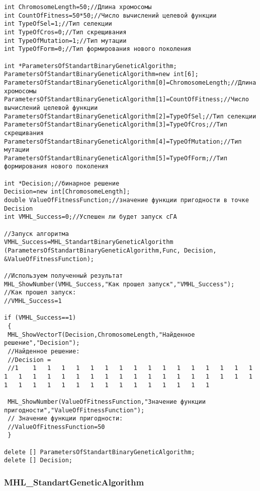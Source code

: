 \documentclass[a4paper,12pt]{article}
\begin{document}
\begin{lstlisting}[label=code_use_MHL_StandartBinaryGeneticAlgorithm,caption=Пример использования]
int ChromosomeLength=50;//Длина хромосомы
int CountOfFitness=50*50;//Число вычислений целевой функции
int TypeOfSel=1;//Тип селекции
int TypeOfCros=0;//Тип скрещивания
int TypeOfMutation=1;//Тип мутации
int TypeOfForm=0;//Тип формирования нового поколения

int *ParametersOfStandartBinaryGeneticAlgorithm;
ParametersOfStandartBinaryGeneticAlgorithm=new int[6];
ParametersOfStandartBinaryGeneticAlgorithm[0]=ChromosomeLength;//Длина хромосомы
ParametersOfStandartBinaryGeneticAlgorithm[1]=CountOfFitness;//Число вычислений целевой функции
ParametersOfStandartBinaryGeneticAlgorithm[2]=TypeOfSel;//Тип селекции
ParametersOfStandartBinaryGeneticAlgorithm[3]=TypeOfCros;//Тип скрещивания
ParametersOfStandartBinaryGeneticAlgorithm[4]=TypeOfMutation;//Тип мутации
ParametersOfStandartBinaryGeneticAlgorithm[5]=TypeOfForm;//Тип формирования нового поколения

int *Decision;//бинарное решение
Decision=new int[ChromosomeLength];
double ValueOfFitnessFunction;//значение функции пригодности в точке Decision
int VMHL_Success=0;//Успешен ли будет запуск cГА

//Запуск алгоритма
VMHL_Success=MHL_StandartBinaryGeneticAlgorithm (ParametersOfStandartBinaryGeneticAlgorithm,Func, Decision, &ValueOfFitnessFunction);

//Используем полученный результат
MHL_ShowNumber(VMHL_Success,"Как прошел запуск","VMHL_Success");
//Как прошел запуск:
//VMHL_Success=1

if (VMHL_Success==1)
 {
 MHL_ShowVectorT(Decision,ChromosomeLength,"Найденное решение","Decision");
 //Найденное решение:
 //Decision =
 //1	1	1	1	1	1	1	1	1	1	1	1	1	1	1	1	1	1	1	1	1	1	1	1	1	1	1	1	1	1	1	1	1	1	1	1	1	1	1	1	1	1	1	1	1	1	1	1	1	1

 MHL_ShowNumber(ValueOfFitnessFunction,"Значение функции пригодности","ValueOfFitnessFunction");
 // Значение функции пригодности:
 //ValueOfFitnessFunction=50
 }

delete [] ParametersOfStandartBinaryGeneticAlgorithm;
delete [] Decision;
\end{lstlisting}

\subsubsection{MHL\_StandartGeneticAlgorithm}\label{MHL_StandartGeneticAlgorithm}
\end{document}

